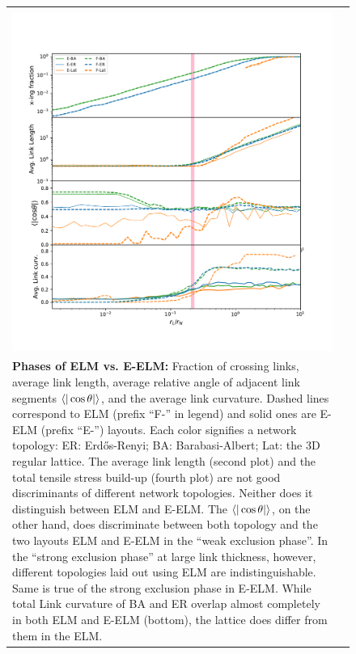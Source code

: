 \documentclass[nofootinbib,preprint,floatfix,titlepage,endfloats]{revtex4} %
\begin{document}
{\begin{figure}
\begin{tabular}{ll}
\begin{minipage}{.7\columnwidth}
    \end{minipage}\\
    \begin{minipage}{.7\columnwidth}
    \includegraphics[width=\columnwidth,trim = 1cm 1cm 1cm 2.5cm, clip]{fig-09-19/phase-cur-succ.pdf}
    \end{minipage}
    &
    \begin{minipage}{.3\textwidth}
         \raggedright
         
    \begin{spacing}{.5}
    {\scriptsize
    ~\\
    \bigskip
         {\bf Phases of ELM vs. E-ELM:} 
         Fraction of crossing links, average link length, average relative angle of adjacent link segments $\be{|\cos\theta |}$, and the average link curvature. Dashed lines correspond to ELM (prefix ``F-'' in legend) and solid ones are E-ELM (prefix ``E-'') layouts. Each color signifies a network topology: ER: Erdős-Renyi; BA: Barabasi-Albert; Lat: the 3D regular lattice.  The average link length (second plot) and the total tensile stress build-up (fourth plot) are not good discriminants of different network topologies. Neither does it distinguish between ELM and E-ELM. The $\be{|\cos\theta |}$, on the other hand, does discriminate between both topology and the two layouts ELM and E-ELM in the  ``weak exclusion phase''. In the ``strong exclusion phase'' at large link thickness, however, different topologies laid out using ELM are indistinguishable. Same is true of the strong exclusion phase in E-ELM. While total Link curvature of BA and ER overlap almost completely in both ELM and E-ELM (bottom), the lattice does differ from them in the ELM.  
    }
    \end{spacing}
    \end{minipage}
         

\end{tabular}
\end{figure}}
\end{document}
